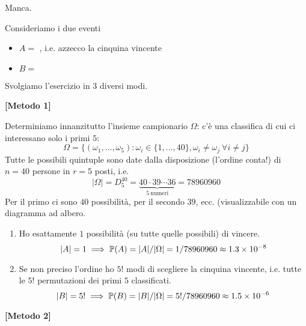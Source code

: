 \Soluzione

Manca.

\Soluzione

Consideriamo i due eventi
\begin{itemize}
	\item $A=$ , i.e. azzecco la cinquina vincente
	\item $B=$ 
\end{itemize}

Svolgiamo l'esercizio in $3$ diversi modi.

\textbf{[Metodo 1]}

Determiniamo innanzitutto l'insieme campionario $\Omega $: c'è una classifica di cui ci interessano solo i primi $5$:
\begin{equation*}
	\Omega =\{(\omega_{1} ,\dots ,\omega_{5}) :\omega_{i} \in \{1,\dots,40\} ,\omega_{i} \neq \omega_{j} \ \forall i\neq j\}
\end{equation*}
Tutte le possibili quintuple sono date dalla disposizione (l'ordine conta!) di $n=40$ persone in $r=5$ posti, i.e.
\begin{equation*}
	|\Omega| =D_{5}^{40} =\underbrace{40\cdot 39\cdots 36}_{5\ \text{numeri}} =78960960
\end{equation*}
Per il primo ci sono $40$ possibilità, per il secondo $39$, ecc. (visualizzabile con un diagramma ad albero.
\begin{enumerate}
	\item Ho esattamente $1$ possibilità (su tutte quelle possibili) di vincere.
	\begin{equation*}
		| A| =1\implies \mathbb{P}(A) =| A| /|\Omega| =1/78960960\approx 1.3\times 10^{-8}
	\end{equation*}
	\item Se non preciso l'ordine ho $5!$ modi di scegliere la cinquina vincente, i.e. tutte le $5!$ permutazioni dei primi $5$ classificati.
	\begin{equation*}
		| B| =5!\implies \mathbb{P}(B) =| B| /|\Omega| =5!/78960960\approx 1.5\times 10^{-6}
	\end{equation*}
\end{enumerate}

\textbf{[Metodo 2]}

